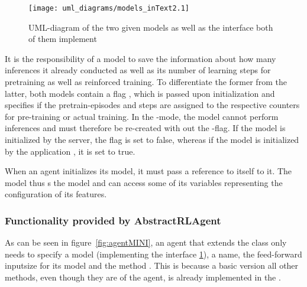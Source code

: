 \begin{figure}[h]
	\centering 
	\texttt{[image: uml\_diagrams/models\_inText2.1]}
	\caption{UML-diagram of the two given models as well as the interface both of them implement}
	\label{fig:modelsInt}
\end{figure}

It is the responsibility of a model to save the information about how many inferences it already conducted as well as its number of learning steps for pretraining as well as reinforced training. To differentiate the former from the latter, both models contain a flag , which is passed upon initialization and specifies if the pretrain-episodes and steps are assigned to the respective counters for pre-training or actual training. In the -mode, the model cannot perform inferences and must therefore be re-created with out the -flag. If the model is initialized by the server, the flag is set to false, whereas if the model is initialized by the application , it is set to true.

When an agent initializes its model, it must pass a reference to itself to it. The model thus s the model and can access some of its variables representing the configuration of its features.


\subsubsection{Functionality provided by AbstractRLAgent}

As can be seen in figure~\ref{fig:agentMINI}, an agent that extends the class  only needs to specify a model (implementing the interface \ref{fig:modelsInt}), a name, the feed-forward inputsize for its model and the method . This is because a basic version all other methods, even though they are  of the agent, is already implemented in the . 

